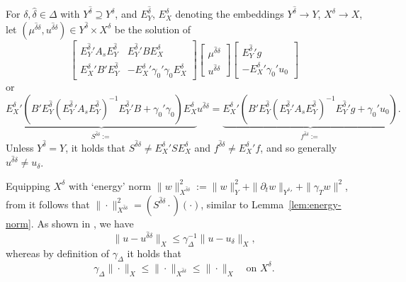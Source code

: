 \documentclass[11pt,a4paper,oneside,english]{amsart}
\numberwithin{equation}{section}
\numberwithin{theorem}{section}
\theoremstyle{definition}
\newcommand{\rvv}[1]{{\color{teal}{RvV: #1}}}
\begin{document}
For $\delta, \hat{\delta} \in \Delta$ with $Y^{\hat{\delta}} \supseteq Y^\delta$, and 
$E_Y^{\hat{\delta}}$, $E_X^\delta$ denoting the embeddings $Y^{\hat{\delta}} \rightarrow Y$,
$X^\delta \rightarrow X$, let $(\mu^{\hat{\delta} \delta},u^{\hat{\delta} \delta}) \in Y^{\hat{\delta}} \times X^\delta$ be the solution of 
\[
  \begin{bmatrix}{E_Y^{\hat{\delta}}}' A_s E_Y^{\hat{\delta}}& {E_Y^{\hat{\delta}}}' B E^\delta_X\\ {E^\delta_X}' B' E_Y^{\hat{\delta}}& -{E^\delta_X}' \gamma_0' \gamma_0 E^\delta_X \end{bmatrix}
  \begin{bmatrix} \mu^{\hat{\delta} \delta} \\ u^{\hat{\delta} \delta} \end{bmatrix}
  \begin{bmatrix} {E^{\hat{\delta}}_Y}' g \\ -{E^\delta_X}' \gamma_0' u_0 \end{bmatrix}
\]
or
\begin{equation}
  \label{eqn:discr-schur}
  \underbrace{
    {E^\delta_X}'(B' E^{\hat{\delta}}_Y({E^{\hat{\delta}}_Y}' A_s E^{\hat{\delta}}_Y)^{-1} {E^{\hat{\delta}}_Y}' B +\gamma_0'\gamma_0)E^\delta_X
  }_{S^{\hat{\delta} \delta}:=}u^{\hat{\delta} \delta}
  =
  \underbrace{
    {E^\delta_X}' (B' E^{\hat{\delta}}_Y({E^{\hat{\delta}}_Y}' A_s E^{\hat{\delta}}_Y)^{-1} {E^{\hat{\delta}}_Y}' g+\gamma_0' u_0)
  }_{f^{\hat{\delta} \delta}:=}.
\end{equation}\rvv{heavy notatie uitstellen?}
Unless $Y^{\hat{\delta}}=Y$, it holds that $S^{\hat{\delta} \delta} \neq {E_X^\delta}' S E_X^\delta$ and $f^{\hat{\delta} \delta} \neq {E_X^\delta}'f$, and so generally $u^{\hat{\delta} \delta} \neq u_\delta$.

Equipping $X^\delta$ with `energy' norm $\|w\|^2_{X^{\hat{\delta}\delta}}:=\|w\|^2_{Y}+ \|\partial_t w\|_{{Y^\delta}'}+\|\gamma_T w\|^2$,
from \cite[Lemma~3.3]{Stevenson2020a} it follows that
$\|\cdot\|_{X^{\hat{\delta}\delta}}^2=(S^{\hat{\delta}\delta}\cdot)(\cdot)$,
similar to Lemma~\ref{lem:energy-norm}. As shown in \cite[Thm.~3.6]{Stevenson2020a}, we have
\begin{equation}
  \label{eqn:galerkin-ortho}
  \|u-u^{\hat{\delta}\delta}\|_X \leq \gamma_\Delta^{-1} \|u-u_\delta\|_X,
\end{equation}
whereas by definition of $\gamma_\Delta$ it holds that
\begin{equation}
  \label{eqn:X-norm-equiv}
  \gamma_\Delta\|\cdot\|_{X} \leq \|\cdot\|_{X^{\hat{\delta}\delta}} \leq \|\cdot\|_{X} \quad\text{on } X^\delta.
\end{equation}
\end{document}
